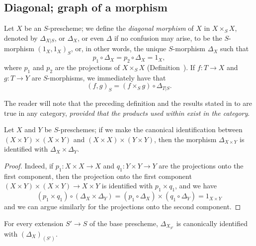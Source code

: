 \subsection{Diagonal; graph of a morphism}
\label{subsection:1.5.3}

\begin{env}[5.3.1]
\label{1.5.3.1}
Let $X$ be an $S$-prescheme;
we define the \emph{diagonal morphism} of $X$ in $X\times_S X$, denoted by $\Delta_{X|S}$, or $\Delta_X$, or even $\Delta$ if no confusion may arise, to be the $S$-morphism $(1_X,1_X)_S$, or, in other words, the unique $S$-morphism $\Delta_X$ such that
\[
\label{1.5.3.1.1}
  p_1\circ\Delta_X=p_2\circ\Delta_X=1_X,
  \tag{5.3.1.1}
\]
where $p_1$ and $p_2$ are the projections of $X\times_S X$ (Definition~).
If $f:T\to X$ and $g:T\to Y$ are $S$-morphisms, we immediately have that
\[
\label{1.5.3.1.2}
  (f,g)_S=(f\times_S g)\circ\Delta_{T|S}.
  \tag{5.3.1.2}
\]

The reader will note that the preceding definition and the results stated in  to  are true in any category, \emph{provided that the products used within exist in the category}.
\end{env}

\begin{proposition}[5.3.2]
\label{1.5.3.2}
Let $X$ and $Y$ be $S$-preschemes;
if we make the canonical identification between $(X\times Y)\times(X\times Y)$ and $(X\times X)\times(Y\times Y)$, then the morphism $\Delta_{X\times Y}$ is identified with $\Delta_X\times\Delta_Y$.
\end{proposition}

\begin{proof}
\label{proof-1.5.3.2}
Indeed, if $p_1:X\times X\to X$ and $q_1:Y\times Y\to Y$ are the projections onto the first component, then the projection onto the first component $(X\times Y)\times(X\times Y)\to X\times Y$ is identified with $p_1\times q_1$, and we have
\[
    (p_1\times q_1)\circ(\Delta_X\times\Delta_Y)=(p_1\circ\Delta_X)\times(q_1\circ\Delta_Y)=1_{X\times Y}
\]
and we can argue similarly for the projections onto the second component.
\end{proof}

\begin{env}
\label{1.5.3.3}
\end{env}

\begin{corollary}[5.3.4]
\label{1.5.3.4}
For every extension $S'\to S$ of the base prescheme, $\Delta_{X_{S'}}$ is canonically identified with $(\Delta_X)_{(S')}$.
\end{corollary}

